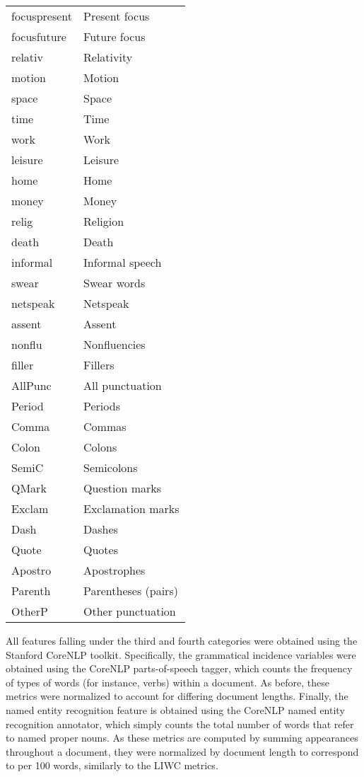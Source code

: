 \documentclass[../thesis.tex]{subfiles}
\begin{document}
\begin{longtable}[t]{ll}
focuspresent & Present focus\\
focusfuture & Future focus\\
\addlinespace
relativ & Relativity\\
motion & Motion\\
space & Space\\
time & Time\\
work & Work\\
\addlinespace
leisure & Leisure\\
home & Home\\
money & Money\\
relig & Religion\\
death & Death\\
\addlinespace
informal & Informal speech\\
swear & Swear words\\
netspeak & Netspeak\\
assent & Assent\\
nonflu & Nonfluencies\\
\addlinespace
filler & Fillers\\
AllPunc & All punctuation\\
Period & Periods\\
Comma & Commas\\
Colon & Colons\\
\addlinespace
SemiC & Semicolons\\
QMark & Question marks\\
Exclam & Exclamation marks\\
Dash & Dashes\\
Quote & Quotes\\
\addlinespace
Apostro & Apostrophes\\
Parenth & Parentheses (pairs)\\
OtherP & Other punctuation\\
\bottomrule
\end{longtable}

All features falling under the third and fourth categories were obtained using the Stanford CoreNLP toolkit. Specifically, the grammatical incidence variables were obtained using the CoreNLP parts-of-speech tagger, which counts the frequency of types of words (for instance, verbs) within a document. As before, these metrics were normalized to account for differing document lengths. Finally, the named entity recognition feature is obtained using the CoreNLP named entity recognition annotator, which simply counts the total number of words that refer to named proper nouns. As these metrics are computed by summing appearances throughout a document, they were normalized by document length to correspond to per 100 words, similarly to the LIWC metrics.
\end{document}
